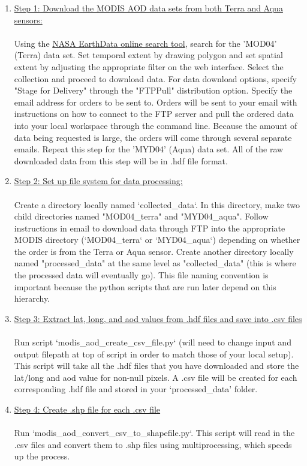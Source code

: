 \begin{enumerate}
\item \underline{Step 1: Download the MODIS AOD data sets from both Terra and Aqua sensors:}\\\\
Using the \href{https://search.earthdata.nasa.gov/search?q=MOD04&ok=MOD04}{NASA EarthData online search tool}, search for the 'MOD04' (Terra) data set. Set temporal extent by drawing polygon and set spatial extent by adjusting the appropriate filter on the web interface. Select the collection and proceed to download data. For data download options, specify "Stage for Delivery" through the "FTPPull" distribution option. Specify the email address for orders to be sent to. Orders will be sent to your email with instructions on how to connect to the FTP server and pull the ordered data into your local workspace through the command line. Because the amount of data being requested is large, the orders will come through several separate emails. Repeat this step for the 'MYD04' (Aqua) data set. All of the raw downloaded data from this step will be in .hdf file format.
\item  \underline{Step 2: Set up file system for data processing:}\\\\ 
Create a directory locally named `collected\_data`. In this directory, make two child directories named "MOD04\_terra" and "MYD04\_aqua". Follow instructions in email to download data through FTP into the appropriate MODIS directory (`MOD04\_terra` or `MYD04\_aqua`) depending on whether the order is from the Terra or Aqua sensor. Create another directory locally named "processed\_data" at the same level as "collected\_data" (this is where the processed data will eventually go). This file naming convention is important because the python scripts that are run later depend on this hierarchy.
\item \underline{Step 3: Extract lat, long, and aod values from .hdf files and save into .csv files}\\\\
Run script `modis\_aod\_create\_csv\_file.py` (will need to change input and output filepath at top of script in order to match those of your local setup). This script will take all the .hdf files that you have downloaded and store the lat/long and aod value for non-null pixels. A .csv file will be created for each corresponding .hdf file and stored in your `processed\_data' folder.
\item \underline{Step 4: Create .shp file for each .csv file}\\\\
Run `modis\_aod\_convert\_csv\_to\_shapefile.py`. This script will read in the .csv files and convert them to .shp files using multiprocessing, which speeds up the process.


\end{enumerate}
